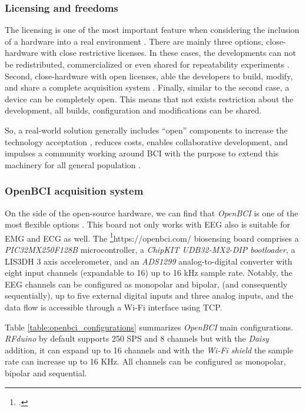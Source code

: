\subsubsection{Licensing and freedoms}

The licensing is one of the most important feature when considering the inclusion of a hardware into a real environment \cite{duan2021educational}. There are mainly three options, close-hardware with close restrictive licenses. In these cases, the developments can not be redistributed, commercialized or even shared for repeatability experiments \cite{mukherjee2019smart}. Second, close-hardware with open licenses, able the developers to build, modify, and share a complete acquisition system \cite{oellermann2022open}. Finally, similar to the second case, a device can be completely open. This means that not exists restriction about the development, all builds, configuration and modifications can be shared.

So, a real-world solution generally includes “open” components to increase the technology acceptation \cite{powell2012democratizing,  legenvre2020open}, reduces costs, enables collaborative development, and impulses a community working around \gls*{BCI} with the purpose to extend this machinery for all general population \cite{wolpaw2012brain}.

\subsubsection{OpenBCI acquisition system}

On the side of the open-source hardware, we can find that \textit{OpenBCI} is one of the most flexible options \cite{laport2019comparative}. This board not only works with \gls*{EEG} also is suitable for \gls*{EMG} and \gls*{ECG} as well. The \footcite{OpenBCI Cyton}{https://openbci.com/} biosensing board comprises a \textit{PIC32MX250F128B} microcontroller, a \textit{ChipKIT UDB32-MX2-DIP bootloader}, a LIS3DH 3 axis accelerometer, and an \textit{ADS1299} analog-to-digital converter with eight input channels (expandable to 16) up to 16 kHz sample rate. Notably, the \gls*{EEG} channels can be configured as monopolar and bipolar, (and consequently sequentially), up to five external digital inputs and three analog inputs, and the data flow is accessible through a Wi-Fi interface using \gls*{TCP}. 

Table \ref{table:openbci_configurations} summarizes \textit{OpenBCI} main configurations. \textit{RFduino} by default supports 250 \gls*{SPS} and 8 channels but with the \textit{Daisy} addition, it can expand up to 16 channels and with the \textit{Wi-Fi shield} the sample rate can increase up to 16 KHz. All channels can be configured as monopolar, bipolar and sequential.

